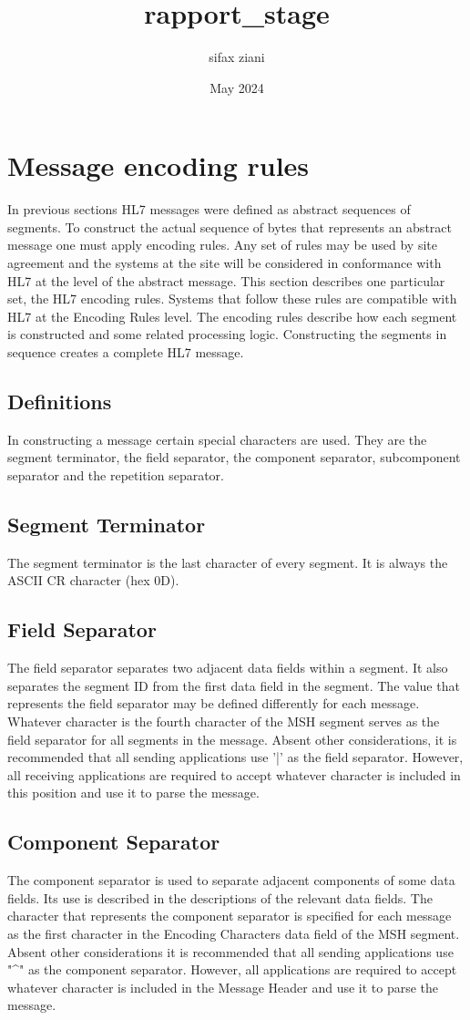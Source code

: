 \documentclass[a4paper,12pt]{article}
\title{rapport_stage}
\author{sifax ziani}
\date{May 2024}
\begin{document}
 

\section{Message encoding rules}
In previous sections HL7 messages were defined as abstract sequences of segments. To construct the actual sequence of bytes that represents an abstract message one must apply encoding rules. Any set of rules may be used by site agreement and the systems at the site will be considered in conformance with HL7 at the level of the abstract message. This section describes one particular set, the HL7 encoding rules. Systems that follow these rules are compatible with HL7 at the Encoding Rules level.
The encoding rules describe how each segment is constructed and some related processing logic. Constructing the segments in sequence creates a complete HL7 message.
\subsection{Definitions}
In constructing a message certain special characters are used. They are the segment terminator, the field separator, the component separator, subcomponent separator and the repetition separator.
\subsection*{Segment Terminator}
The segment terminator is the last character of every segment. It is always the ASCII CR character (hex 0D).
\subsection*{Field Separator}
The field separator separates two adjacent data fields within a segment. It also separates the segment ID from the first data field in the segment. The value that represents the field separator may be defined differently for each message. Whatever character is the fourth character of the MSH segment serves as the field separator for all segments in the message. Absent other considerations, it is recommended that all sending applications use '|' as the field separator. However, all receiving applications are required to accept whatever character is included in this position and use it to parse the message.
\subsection*{Component Separator}
The component separator is used to separate adjacent components of some data fields. Its use is described in the descriptions of the relevant data fields. The character that represents the component separator is specified for each message as the first character in the Encoding Characters data field of the MSH segment. Absent other considerations it is recommended that all sending applications use 
 "\textasciicircum" as the component separator. However, all applications are required to accept whatever character is included in the Message Header and use it to parse the message.
\end{document}
